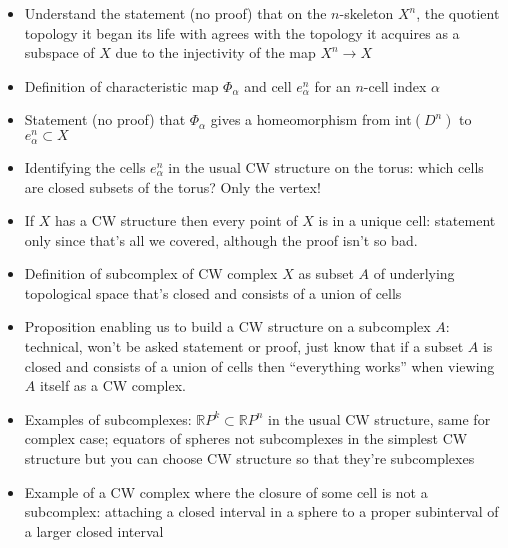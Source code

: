 \documentclass[12pt]{article}
\newcommand{\rl}{\mathbb{R}}
\begin{document}
\begin{itemize}
\vspace*{30mm}
\item Understand the statement (no proof) that on the $n$-skeleton $X^n$, the quotient
topology it began its life with agrees with the topology it acquires as a subspace of $X$ due
to the injectivity of the map $X^n\to X$


\vspace*{30mm}
\item Definition of characteristic map $\Phi_\alpha$ and cell $e^n_
\alpha$ for an $n$-cell index $\alpha$


\vspace*{30mm}
\item Statement (no proof) that $\Phi_\alpha$ gives a homeomorphism from int$(D^n)$ to
$e^n_\alpha\subset X$


\vspace*{30mm}
\item Identifying the cells $e^n_\alpha$ in the usual CW structure on the torus: which cells are closed
subsets of the torus? Only the vertex!


\vspace*{30mm}
\item If $X$ has a CW structure then every point of $X$ is in a unique cell: statement only
since that’s all we covered, although the proof isn't so bad.


\vspace*{30mm}
\item Definition of subcomplex of CW complex $X$ as subset $A$ of underlying topological
space that’s closed and consists of a union of cells


\vspace*{30mm}
\item Proposition enabling us to build a CW structure on a subcomplex $A$: technical, won't
be asked statement or proof, just know that if a subset $A$ is closed and consists of a
union of cells then “everything works” when viewing $A$ itself as a CW complex.


\vspace*{30mm}
\item Examples of subcomplexes: $\rl P^k\subset \rl P^n$ in the usual CW structure, same for complex
case; equators of spheres not subcomplexes in the simplest CW structure but you can
choose CW structure so that they're subcomplexes


\vspace*{30mm}
\item Example of a CW complex where the closure of some cell is not a subcomplex:
attaching a closed interval in a sphere to a proper subinterval of a larger closed
interval


\vspace*{30mm}
\end{itemize}
\end{document}
